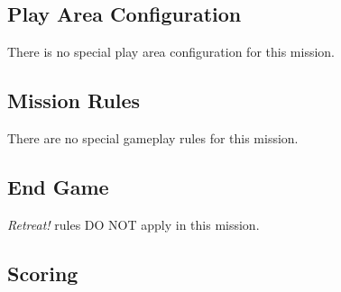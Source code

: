 \label{mission:annihilation}

\subsection{Play Area Configuration}

There is no special play area configuration for this mission.

\subsection{Mission Rules}

There are no special gameplay rules for this mission.

\subsection{End Game}

\emph{Retreat!} rules DO NOT apply in this mission.

\subsection{Scoring}

